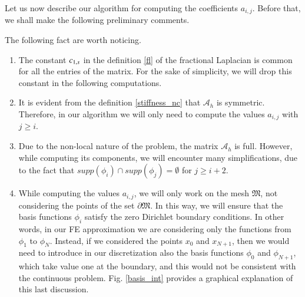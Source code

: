 Let us now describe our algorithm for computing the coefficients $a_{i,j}$. Before that, we shall make the following preliminary comments.
\begin{remark}\label{rem_prel}
The following fact are worth noticing.
\begin{enumerate}
	\item The constant $c_{1,s}$ in the definition \eqref{fl} of the fractional Laplacian is common for all the entries of the matrix. For the sake of simplicity, we will drop this constant in the following computations.  
	
	\item It is evident from the definition \eqref{stiffness_nc} that $\mathcal A_h$ is symmetric. Therefore, in our algorithm we will only need to compute the values $a_{i,j}$ with $j\geq i$.
	
	\item Due to the non-local nature of the problem, the matrix $\mathcal A_h$ is full. However, while computing its components, we will encounter many simplifications, due to the fact that $supp(\phi_i)\cap supp(\phi_j) =\emptyset$ for $j\geq i+2$.
	
	\item While computing the values $a_{i,j}$, we will only work on the mesh $\mathfrak{M}$, not considering the points of the set $\partial\mathfrak{M}$. In this way, we will ensure that the basis functions $\phi_i$ satisfy the zero Dirichlet boundary conditions. In other words, in our FE approximation we are considering only the functions from $\phi_1$ to $\phi_N$. Instead, if we considered the points $x_0$ and $x_{N+1}$, then we would need to introduce in our discretization also the basis functions $\phi_0$ and $\phi_{N+1}$, which take value one at the boundary, and this would not be consistent with the continuous problem. Fig. \ref{basis_int} provides a graphical explanation of this last discussion.      	
\end{enumerate}
\end{remark}


